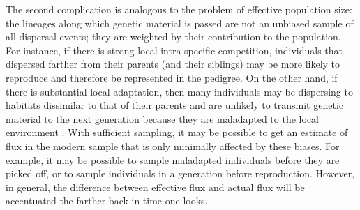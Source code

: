 \documentclass{ar-1col}
\begin{document}
The second complication is analogous to the problem of effective population size:
the lineages along which genetic material is passed are not an unbiased sample of all dispersal events;
they are weighted by their contribution to the population.
For instance, if there is strong local intra-specific competition,
individuals that dispersed farther from their parents (and their siblings)
may be more likely to reproduce and therefore be represented in the pedigree.
On the other hand, if there is substantial local adaptation,
then many individuals may be dispersing to habitats dissimilar to that of their parents
and are unlikely to transmit genetic material to the next generation
because they are maladapted to the local environment
\citep[for a review, see][]{wangbradburd2014}.
With sufficient sampling,
it may be possible to get an estimate of flux in the modern sample
that is only minimally affected by these biases.
For example, it may be possible to sample maladapted individuals
before they are picked off,
or to sample individuals in a generation before reproduction.
However, in general, the difference between effective flux and actual flux
will be accentuated the farther back in time one looks.

\end{document}
